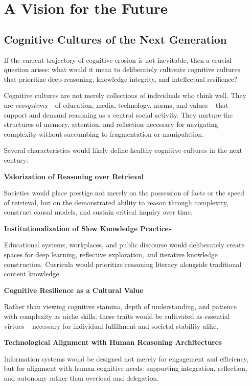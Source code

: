 \chapter{A Vision for the Future}

\section{Cognitive Cultures of the Next Generation}

If the current trajectory of cognitive erosion is not inevitable, then a
crucial question arises: what would it mean to deliberately cultivate
cognitive cultures that prioritize deep reasoning, knowledge integrity,
and intellectual resilience?

Cognitive cultures are not merely collections of individuals who think
well. They are \textit{ecosystems} -- of education, media, technology, norms, and
values -- that support and demand reasoning as a central social activity.
They nurture the structures of memory, attention, and reflection
necessary for navigating complexity without succumbing to fragmentation
or manipulation.

Several characteristics would likely define healthy cognitive cultures
in the next century:

\textbf{Valorization of Reasoning over Retrieval}

Societies would place prestige not merely on the possession of facts or
the speed of retrieval, but on the demonstrated ability to reason
through complexity, construct causal models, and sustain critical
inquiry over time.

\textbf{Institutionalization of Slow Knowledge Practices}

Educational systems, workplaces, and public discourse would deliberately
create spaces for deep learning, reflective exploration, and iterative
knowledge construction. Curricula would prioritize reasoning literacy
alongside traditional content knowledge.

\textbf{Cognitive Resilience as a Cultural Value}

Rather than viewing cognitive stamina, depth of understanding, and
patience with complexity as niche skills, these traits would be
cultivated as essential virtues -- necessary for individual fulfillment
and societal stability alike.

\textbf{Technological Alignment with Human Reasoning Architectures}

Information systems would be designed not merely for engagement and
efficiency, but for alignment with human cognitive needs: supporting
integration, reflection, and autonomy rather than overload and
delegation.

